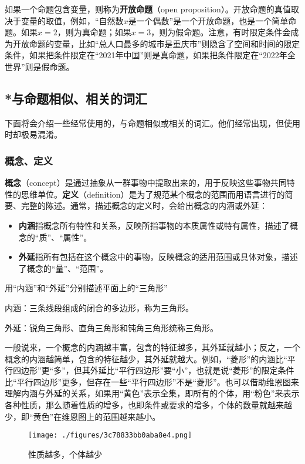 如果一个命题包含变量，则称为\textbf{开放命题}（open proposition）。开放命题的真值取决于变量的取值，例如，“自然数$x$是一个偶数”是一个开放命题，也是一个简单命题。如果$x=2$，则为真命题；如果$x=3$，则为假命题。注意，有时限定条件会成为开放命题的变量，比如“总人口最多的城市是重庆市”则隐含了空间和时间的限定条件，如果把条件限定在“2021年中国”则是真命题，如果把条件限定在“2022年全世界”则是假命题。

\subsection{*与命题相似、相关的词汇}

下面将会介绍一些经常使用的，与命题相似或相关的词汇。他们经常出现，但使用时却极易混淆。

\subsubsection{概念、定义}

\textbf{概念}（concept）是通过抽象从一群事物中提取出来的，用于反映这些事物共同特性的思维单位。\textbf{定义}（definition）是为了规范某个概念的范围而用语言进行的简要、完整的陈述。通常，描述概念的定义时，会给出概念的内涵或外延：
\begin{itemize}
\item \textbf{内涵}指概念所有特性和关系，反映所指事物的本质属性或特有属性，描述了概念的“质”、“属性”。
\item \textbf{外延}指所有包括在这个概念中的事物，反映概念的适用范围或具体对象，描述了概念的“量”、“范围”。
\end{itemize}

\begin{example}{用“内涵”和“外延”分别描述平面上的“三角形”}

内涵：三条线段组成的闭合的多边形，称为三角形。

外延：锐角三角形、直角三角形和钝角三角形统称三角形。

\end{example}

一般说来，一个概念的内涵越丰富，包含的特征越多，其外延就越小；反之，一个概念的内涵越简单，包含的特征越少，其外延就越大。例如，“菱形”的内涵比“平行四边形”更“多”，但其外延比“平行四边形”要“小”，也就是说“菱形”的限定条件比“平行四边形”更多，但存在一些“平行四边形”不是“菱形”。也可以借助维恩图来理解内涵与外延的关系，如果用“黄色”表示全集，即所有的个体，用“粉色”来表示各种性质，那么随着性质的增多，也即条件或要求的增多，个体的数量就越来越少，即“黄色”在维恩图上的范围越来越小。
\begin{figure}[ht]
\centering
\texttt{[image: ./figures/3c78833bb0aba8e4.png]}
\caption{性质越多，个体越少} \label{fig_SufCnd_6}
\end{figure}

